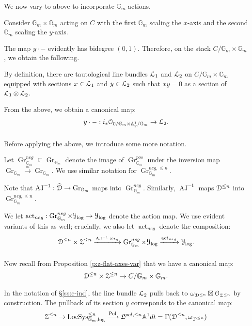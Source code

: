 \documentclass[reqno,11pt]{amsart}
\numberwithin{equation}{subsection}
\theoremstyle{remark}
\newcommand{\xar}[1]{\xrightarrow{#1}}
\newcommand{\rar}[1]{\xar{#1}}
\newcommand{\isom}{\rar{\simeq}}
\newcommand{\bA}{{\mathbb A}}
\newcommand{\bG}{{\mathbb G}}
\newcommand{\sD}{{\EuScript D}}
\newcommand{\sL}{{\EuScript L}}
\newcommand{\sO}{{\EuScript O}}
\newcommand{\sY}{{\EuScript Y}}
\newcommand{\sZ}{{\EuScript Z}}
\newcommand{\fL}{{\mathfrak L}}
\newcommand{\on}{\operatorname}
\newcommand{\act}{\on{act}}
\newcommand{\Gr}{\on{Gr}}
\newcommand{\LocSys}{\on{LocSys}}
\newcommand{\AJ}{\on{AJ}}
\newcommand{\Pol}{\on{Pol}}
\renewcommand{\subset}{\subseteq}
\begin{document}
We now vary to above to incorporate $\bG_m$-actions.

Consider $\bG_m \times \bG_m$ acting on
$C$ with the first $\bG_m$ scaling the $x$-axis
and the second $\bG_m$ scaling the $y$-axis.

The map $y\cdot-$ evidently has bidegree
$(0,1)$.
Therefore, on the stack $C/\bG_m\times\bG_m$, we obtain
the following. 

By definition, there are tautological line bundles 
$\sL_1$ and $\sL_2$ on $C/\bG_m\times \bG_m$
equipped with sections $x \in \sL_1$ and 
$y \in \sL_2$ such that
$xy = 0$ as a section of $\sL_1 \otimes \sL_2$. 

From the above, we obtain a canonical map:
%
\begin{equation}\label{eq:sections-ann}
y\cdot -: i_*\sO_{0/\bG_m \times \bA_y^1/\bG_m} \to \sL_2.
\end{equation}

\subsubsection{}

Before applying the above, we introduce some more
notation.

Let $\Gr_{\bG_m}^{neg} \subset \Gr_{\bG_m}$ denote
the image of $\Gr_{\bG_m}^{pos}$ under the inversion
map $\Gr_{\bG_m} \isom \Gr_{\bG_m}$. 
We use similar notation for $\Gr_{\bG_m}^{neg,\leq n}$.

Note that $\AJ^{-1}:\widehat{\sD} \to \Gr_{\bG_m}$
maps into $\Gr_{\bG_m}^{neg}$. Similarly,
$\AJ^{-1}$ maps $\sD^{\leq n}$ into 
$\Gr_{\bG_m}^{neg,\leq n}$.

We let $\act_{neg}:\Gr_{\bG_m}^{neg} \times \sY_{\log}
\to \sY_{\log}$ denote the action map.
We use evident variants of this as well; crucially,
we also let $\act_{neg}$ denote the composition:
%
\[
\sD^{\leq n} \times \sZ^{\leq n} 
\xar{\AJ^{-1} \times i_n} 
\Gr_{\bG_m}^{neg} \times \sY_{\log} \xar{\act_{neg}}
\sY_{\log}.
\] 

\subsubsection{}\label{ss:act-inv}

Now recall from Proposition \ref{p:z-flat-axes-var}
that we have a canonical map:
%
\[
\sD^{\leq n} \times \sZ^{\leq n} \to 
C/\bG_m \times \bG_m.
\]

In the notation of \S \ref{ss:c-ind},
the line bundle $\sL_2$ pulls
back to 
$\omega_{\sD^{\leq n}} \boxtimes \sO_{\sZ^{\leq n}}$  
by construction. The pullback of its section $y$ 
corresponds to the canonical map:
%
\[
\sZ^{\leq n} \to \LocSys_{\bG_m,\log}^{\leq n}
\xar{\Pol}
\fL^{pol,\leq n} \bA^1 dt = 
\Gamma(\sD^{\leq n},\omega_{\sD^{\leq n}})  
\] 
\end{document}
